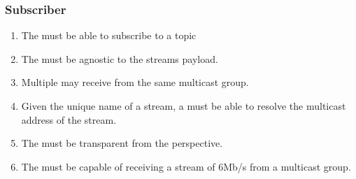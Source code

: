 \subsubsection*{Subscriber}
\begin{enumerate}
	\item The \subs{} must be able to subscribe to a topic
	\item The \sub{} must be agnostic to the streams payload.
	\item Multiple \subs{} may receive from the same multicast group.
	\item Given the unique name of a stream, a  must be able to resolve the multicast address of the stream.
	\item The \sub{} must be transparent from the \con{} perspective.
	\item The \sub{} must be capable of receiving a stream of 6Mb/s from a multicast group.
\end{enumerate}

